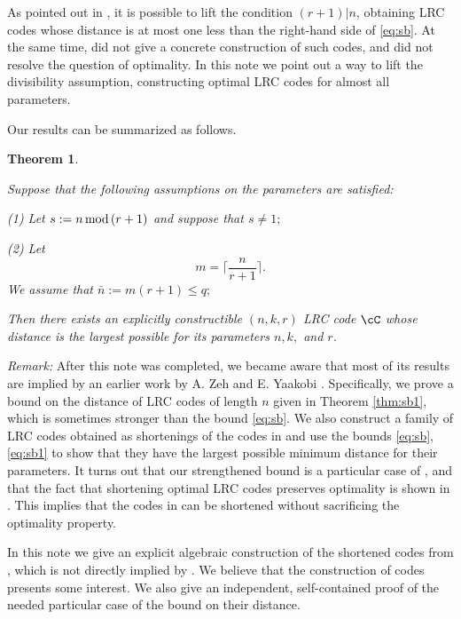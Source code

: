 \documentclass{IEEEtran}
\newtheorem{theorem}{Theorem}[section]
\newcounter{construction}[section]
\newcommand{\Mod}[1]{\,\textup{mod}\,#1}
\begin{document}
 As pointed out in \cite{OptimalLRC}, it is possible to lift the condition $(r+1)|n$, obtaining LRC codes whose distance is
 at most one less than the right-hand side of \eqref{eq:sb}. At the same time, \cite{OptimalLRC} did not give a concrete
 construction of such codes, and did not resolve the question of optimality. In this note we point out a way to 
 lift the divisibility assumption, constructing optimal LRC codes for almost all parameters. 
 
 Our results can be summarized as follows.
 \begin{theorem} \label{thm:main}
{Suppose that the following assumptions on the parameters are satisfied:
 
 (1) Let $s:=n\Mod (r+1)$ and suppose that $s\ne 1;$
 
(2)  Let 
     $$
    m=\Big\lceil\frac  n{r+1}\Big\rceil.
     $$
We assume that $\bar n:=m(r+1)\le q;$ 

 Then there exists an explicitly constructible $(n,k,r)$ LRC code $\cC$ whose distance is the largest possible for its parameters $n,k,$ and $r$.}
 \end{theorem}

{\em Remark:}
After this note was completed, we became aware that most of its results are implied by an earlier work by A. Zeh and 
E. Yaakobi \cite{ZY16}. Specifically, we prove a bound on the distance of LRC codes of
length $n$ given in Theorem \ref{thm:sb1}, which is sometimes stronger than the bound \eqref{eq:sb}. We also construct a family
of LRC codes obtained as shortenings of the codes in \cite{OptimalLRC} and 
use the bounds \eqref{eq:sb}, \eqref{eq:sb1} to show that they have the largest possible minimum
distance for their parameters. It turns out that our strengthened bound is a particular case of \cite[Thm.6]{ZY16},
and that the fact that shortening optimal LRC codes preserves optimality is shown in \cite[Thm.13]{ZY16}. 
This implies that the codes in \cite{OptimalLRC} can be shortened without sacrificing the optimality property.

In this note we give an explicit algebraic construction of the shortened codes from \cite{OptimalLRC}, which is not directly implied by \cite{ZY16}. We believe that the construction of codes presents some interest.
 We also give an independent, self-contained proof of the needed particular case of the bound on their distance. 
  
\end{document}
